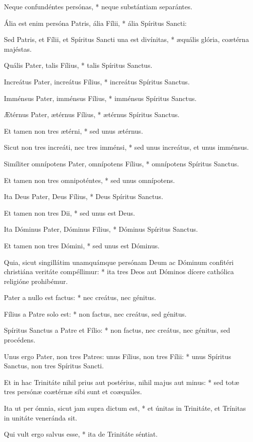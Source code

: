 Neque confundéntes persónas, * neque substántiam separántes.

Ália est enim persóna Patris, ália Fílii, * ália Spíritus Sancti:

Sed Patris, et Fílii, et Spíritus Sancti una est divínitas, * æquális glória, coætérna majéstas.

Quális Pater, talis Fílius, * talis Spíritus Sanctus.

Increátus Pater, increátus Fílius, * increátus Spíritus Sanctus.

Imménsus Pater, imménsus Fílius, * imménsus Spíritus Sanctus.

Ætérnus Pater, ætérnus Fílius, * ætérnus Spíritus Sanctus.

Et tamen non tres ætérni, * sed unus ætérnus.

Sicut non tres increáti, nec tres imménsi, * sed unus increátus, et unus imménsus.

Simíliter omnípotens Pater, omnípotens Fílius, * omnípotens Spíritus Sanctus.

Et tamen non tres omnipoténtes, * sed unus omnípotens.

Ita Deus Pater, Deus Fílius, * Deus Spíritus Sanctus.

Et tamen non tres Dii, * sed unus est Deus.

Ita Dóminus Pater, Dóminus Fílius, * Dóminus Spíritus Sanctus.

Et tamen non tres Dómini, * sed unus est Dóminus.

Quia, sicut singillátim unamquámque persónam Deum ac Dóminum confitéri christiána veritáte compéllimur: * ita tres Deos aut Dóminos dícere cathólica religióne prohibémur.

Pater a nullo est factus: * nec creátus, nec génitus.

Fílius a Patre solo est: * non factus, nec creátus, sed génitus.

Spíritus Sanctus a Patre et Fílio: * non factus, nec creátus, nec génitus, sed procédens.

Unus ergo Pater, non tres Patres: unus Fílius, non tres Fílii: * unus Spíritus Sanctus, non tres Spíritus Sancti.

Et in hac Trinitáte nihil prius aut postérius, nihil majus aut minus: * sed totæ tres persónæ coætérnæ sibi sunt et coæquáles.

Ita ut per ómnia, sicut jam supra dictum est, * et únitas in Trinitáte, et Trínitas in unitáte veneránda sit.

Qui vult ergo salvus esse, * ita de Trinitáte séntiat.

